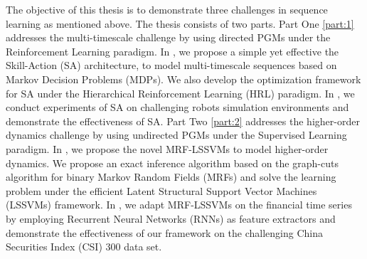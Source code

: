 The objective of this thesis is to demonstrate three challenges
in sequence learning as mentioned above. The thesis consists of
two parts. Part One \ref{part:1} addresses the multi-timescale
challenge by using directed PGMs under the Reinforcement Learning
paradigm. In , we propose a simple yet effective
the Skill-Action (SA) architecture, to model multi-timescale
sequences based on Markov Decision Problems (MDPs). We also
develop the optimization framework for SA under the Hierarchical
Reinforcement Learning (HRL) paradigm. In ,
we conduct experiments of SA on challenging robots simulation
environments and demonstrate the effectiveness of SA. Part Two
\ref{part:2} addresses the higher-order dynamics challenge by
using undirected PGMs under the Supervised Learning paradigm. In
, we propose the novel MRF-LSSVMs to model
higher-order dynamics. We propose an exact inference algorithm
based on the graph-cuts algorithm for binary Markov Random Fields
(MRFs) and solve the learning problem under the efficient Latent
Structural Support Vector Machines (LSSVMs) framework. In
, we adapt MRF-LSSVMs on the financial
time series by employing Recurrent Neural Networks (RNNs) as
feature extractors and demonstrate the effectiveness of our
framework on the challenging China Securities Index (CSI) 300
data set.

